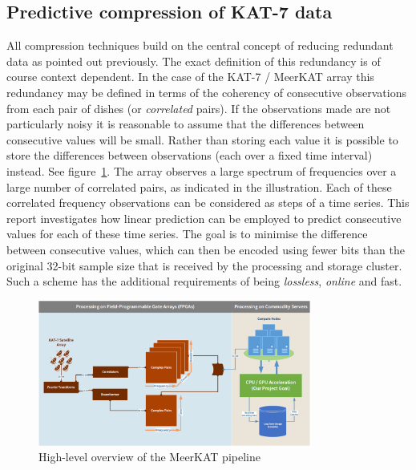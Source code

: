 \subsection{Predictive compression of KAT-7 data}
All compression techniques build on the central concept of reducing redundant data as pointed out previously. The exact definition of this redundancy is of course context 
dependent. In the case of the KAT-7 / MeerKAT array this redundancy may be defined in terms of the coherency of consecutive observations from each pair of dishes 
(or \textit{correlated} pairs). If the observations made are not particularly noisy it is reasonable to assume that the differences between consecutive values will be small.
Rather than storing each value it is possible to store the differences between observations (each over a fixed time interval) instead. See figure~\ref{MeerKAT_PIPELINE}. 
The array observes a large spectrum of frequencies over a large number of correlated pairs, as indicated in the illustration. Each of these correlated frequency 
observations can be considered as steps of a time series. This report investigates how linear prediction can be employed to predict consecutive values for each of these time 
series. The goal is to minimise the difference between consecutive values, which can then be encoded using fewer bits than the original 32-bit sample size that is received 
by the processing and storage cluster. Such a scheme has the additional requirements of being \textit{lossless}, \textit{online} and fast.

\begin{figure}[h!]
\begin{mdframed}
 \centering
 \includegraphics[width=0.8\textwidth]{Process.png}
 \caption{High-level overview of the MeerKAT pipeline}
 \label{MeerKAT_PIPELINE}
\end{mdframed}
\end{figure}

